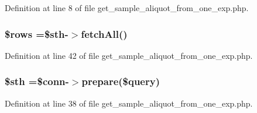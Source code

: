 Definition at line 8 of file get\-\_\-sample\-\_\-aliquot\-\_\-from\-\_\-one\-\_\-exp.\-php.

\hypertarget{get__sample__aliquot__from__one__exp_8php_ace2ec39e7df3899fa8df9640ec274b03}{
\subsubsection[{\$rows}]{\setlength{\rightskip}{0pt plus 5cm}\$rows =\$sth-\/$>$fetch\-All()}}\label{get__sample__aliquot__from__one__exp_8php_ace2ec39e7df3899fa8df9640ec274b03}


Definition at line 42 of file get\-\_\-sample\-\_\-aliquot\-\_\-from\-\_\-one\-\_\-exp.\-php.

\hypertarget{get__sample__aliquot__from__one__exp_8php_afa9126f9664959c02795be300a135f93}{
\subsubsection[{\$sth}]{\setlength{\rightskip}{0pt plus 5cm}\$sth =\$conn-\/$>$prepare(\$query)}}\label{get__sample__aliquot__from__one__exp_8php_afa9126f9664959c02795be300a135f93}


Definition at line 38 of file get\-\_\-sample\-\_\-aliquot\-\_\-from\-\_\-one\-\_\-exp.\-php.

